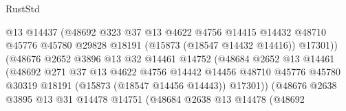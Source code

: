 \begin{lexlean}{RustStd}
\begin{coremodule}
                                      @13
                                      @14437
                                      (@48692
                                        @323
                                        @37
                                        @13
                                        @4622
                                        @4756
                                        @14415
                                        @14432
                                        @48710
                                        @45776
                                        @45780
                                        @29828
                                        @18191
                                        (@15873 (@18547 @14432 @14416))
                                        @17301))
                                    (@48676
                                      @2652
                                      @3896
                                      @13
                                      @32
                                      @14461
                                      @14752
                                      (@48684
                                        @2652
                                        @13
                                        @14461
                                        (@48692
                                          @271
                                          @37
                                          @13
                                          @4622
                                          @4756
                                          @14442
                                          @14456
                                          @48710
                                          @45776
                                          @45780
                                          @30319
                                          @18191
                                          (@15873 (@18547 @14456 @14443))
                                          @17301))
                                      (@48676
                                        @2638
                                        @3895
                                        @13
                                        @31
                                        @14478
                                        @14751
                                        (@48684
                                          @2638
                                          @13
                                          @14478
                                          (@48692

\end{coremodule}
\end{lexlean}
